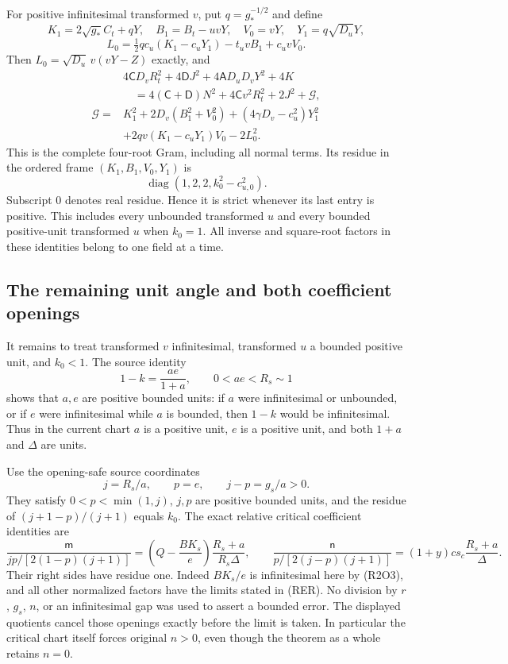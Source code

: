 For positive infinitesimal transformed $v$, put
$q=g_*^{-1/2}$ and define
\[
K_1=2\sqrt{g_*}C_t+qY,\quad
B_1=B_t-uvY,\quad V_0=vY,\quad Y_1=q\sqrt{D_u}Y,
\]
\[
L_0=\tfrac12q c_u(K_1-c_uY_1)-t_uvB_1+c_uvV_0.
\]
Then $L_0=\sqrt{D_u}\,v(vY-Z)$ exactly, and
\begin{align*}
&4\mathsf C D_vR_t^2+4\mathsf D J^2
       +4\mathsf A D_uD_vY^2+4K\\
&\quad=4(\mathsf C+\mathsf D)N^2+4\mathsf C v^2R_t^2
 +2J^2+\mathcal G,\\
\mathcal G={}&K_1^2+2D_v(B_1^2+V_0^2)
 +(4\gamma D_v-c_u^2)Y_1^2\\
&+2qv(K_1-c_uY_1)V_0-2L_0^2.
\tag{R2O11}
\end{align*}
This is the complete four-root Gram, including all normal terms.  Its
residue in the ordered frame $(K_1,B_1,V_0,Y_1)$ is
\[
\operatorname{diag}(1,2,2,k_0^2-c_{u,0}^2).
\tag{R2O12}
\]
Subscript $0$ denotes real residue.  Hence it is strict whenever its
last entry is positive.  This includes every unbounded transformed
$u$ and every bounded positive-unit transformed $u$ when $k_0=1$.
All inverse and square-root factors in these identities belong to one
field at a time.

\subsection{The remaining unit angle and both coefficient openings}

It remains to treat transformed $v$ infinitesimal, transformed $u$ a
bounded positive unit, and $k_0<1$.  The source identity
\[
1-k=\frac{ae}{1+a},\qquad 0<ae<R_s\sim1
\tag{R2O13}
\]
shows that $a,e$ are positive bounded units: if $a$ were infinitesimal
or unbounded, or if $e$ were infinitesimal while $a$ is bounded, then
$1-k$ would be infinitesimal.  Thus in the current chart $a$ is a
positive unit, $e$ is a positive unit, and both $1+a$ and $\Delta$
are units.

Use the opening-safe source coordinates
\[
j=R_s/a,\qquad p=e,\qquad j-p=g_s/a>0.
\tag{R2O14}
\]
They satisfy $0<p<\min(1,j)$, $j,p$ are positive bounded units, and
the residue of $(j+1-p)/(j+1)$ equals $k_0$.  The exact relative
critical coefficient identities are
\[
\frac{\mathsf m}{jp/[2(1-p)(j+1)]}
 =\left(Q-\frac{BK_s}{e}\right)\frac{R_s+a}{R_s\Delta},
\qquad
\frac{\mathsf n}{p/[2(j-p)(j+1)]}
 =(1+y)c s_c\frac{R_s+a}{\Delta}.
\tag{R2O15}
\]
Their right sides have residue one.  Indeed $BK_s/e$ is infinitesimal
here by (R2O3), and all other normalized factors have the limits stated
in (RER).  No division by $r$, $g_s$, $n$, or an infinitesimal gap
was used to assert a bounded error.  The displayed quotients cancel
those openings exactly before the limit is taken.  In particular the
critical chart itself forces original $n>0$, even though the theorem
as a whole retains $n=0$.

